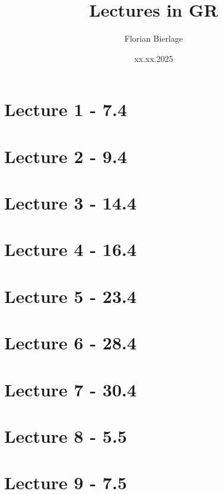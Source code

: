 \documentclass[]{scrbook}
\title{Lectures in GR}
\author{Florian Bierlage}
\date{xx.xx.2025}
\begin{document}
\maketitle
\newpage
\tableofcontents
\newpage

\section*{Lecture 1 - 7.4}


\section*{Lecture 2 - 9.4}


\section*{Lecture 3 - 14.4}


\section*{Lecture 4 - 16.4}


\section*{Lecture 5 - 23.4}


\section*{Lecture 6 - 28.4}


\section*{Lecture 7 - 30.4}


\section*{Lecture 8 - 5.5}


\section*{Lecture 9 - 7.5}

\end{document}
